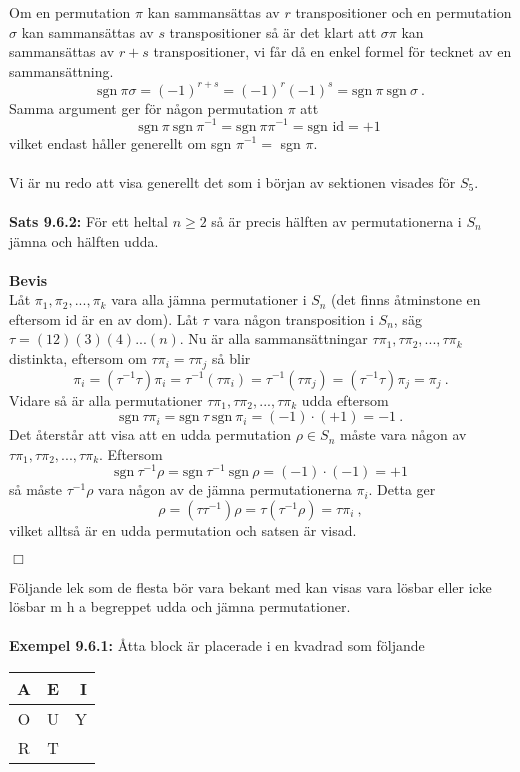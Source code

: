 \documentclass{article}
\begin{document}
Om en permutation $\pi$ kan sammansättas av $r$ transpositioner och en permutation $\sigma$ kan sammansättas av $s$ transpositioner så är det klart att $\sigma\pi$ kan sammansättas av $r+s$ transpositioner, vi får då en enkel formel för tecknet av en sammansättning.
$$
\textrm{sgn} \ \pi\sigma=(-1)^{r+s}=(-1)^r(-1)^s=\textrm{sgn} \ \pi \ \textrm{sgn} \ \sigma \ .
$$
Samma argument ger för någon permutation $\pi$ att
$$
\textrm{sgn} \ \pi \ \textrm{sgn} \ \pi^{-1}=\textrm{sgn} \ \pi\pi^{-1}=\textrm{sgn id}=+1 \
$$
vilket endast håller generellt om sgn $\pi^{-1}=$ sgn $\pi$.
\\ \\
Vi är nu redo att visa generellt det som i början av sektionen visades för $S_5$.
\\ \\
\textbf{Sats 9.6.2:} För ett heltal $n\geq2$ så är precis hälften av permutationerna i $S_n$ jämna och hälften udda.
\\ \\
\textbf{Bevis}
\\
Låt $\pi_1,\pi_2,...,\pi_k$ vara alla jämna permutationer i $S_n$ (det finns åtminstone en eftersom id är en av dom). Låt $\tau$ vara någon transposition i $S_n$, säg $\tau=(12)(3)(4)...(n)$. Nu är alla sammansättningar $\tau\pi_1,\tau\pi_2,...,\tau\pi_k$ distinkta, eftersom om $\tau\pi_i=\tau\pi_j$ så blir
$$
\pi_i=(\tau^{-1}\tau)\pi_i=\tau^{-1}(\tau\pi_i)=\tau^{-1}(\tau\pi_j)=(\tau^{-1}\tau)\pi_j=\pi_j \ .
$$
Vidare så är alla permutationer $\tau\pi_1,\tau\pi_2,...,\tau\pi_k$ udda eftersom 
$$
\textrm{sgn} \ \tau\pi_i=\textrm{sgn} \ \tau \ \textrm{sgn} \ \pi_i=(-1)\cdot(+1)=-1 \ .
$$
Det återstår att visa att en udda permutation $\rho\in S_n$ måste vara någon av $\tau\pi_1,\tau\pi_2,...,\tau\pi_k$. Eftersom 
$$
\textrm{sgn} \ \tau^{-1}\rho=\textrm{sgn} \ \tau^{-1} \ \textrm{sgn} \ \rho=(-1)\cdot(-1)=+1  
$$
så måste $\tau^{-1}\rho$ vara någon av de jämna permutationerna $\pi_i$. Detta ger
$$
\rho=(\tau\tau^{-1})\rho=\tau(\tau^{-1}\rho)=\tau\pi_i \ ,
$$
vilket alltså är en udda permutation och satsen är visad.
\begin{flushright}
$\Box$
\end{flushright}
Följande lek som de flesta bör vara bekant med kan visas vara lösbar eller icke lösbar m h a begreppet udda och jämna permutationer.
\\ \\
\textbf{Exempel 9.6.1:} Åtta block är placerade i en kvadrad som följande
\begin{center}
\begin{tabular}{| c | c | r |}
\hline
A & E & I
\\ \hline
O & U & Y
\\ \hline
R & T &
\\ \hline
\end{tabular}
\end{center}
\end{document}
